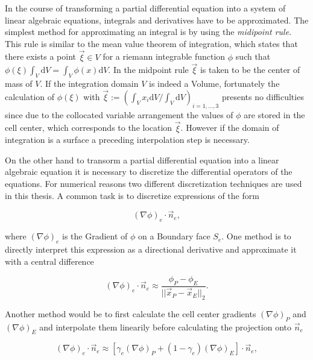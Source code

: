     In the course of transforming a partial differential equation into a system of linear algebraic equations, integrals and derivatives have to be approximated. The simplest method for approximating an integral is by using the \textit{midipoint rule}. This rule is similar to the mean value theorem of integration, which states that there exists a point \(\vec{\xi} \in V\) for a riemann integrable function \(\phi\) such that \(\phi(\xi) \int_V \mathrm{d}V = \int_V \phi(x) \mathrm{d}V\). In the midpoint rule \(\vec{\xi}\) is taken to be the center of mass of \(V\). If the integration domain \(V\) is indeed a Volume, fortunately the calculation of \(\phi(\mathbb{\xi})\) with \(\vec{\xi} := \left({ \int_V x_i \mathrm{d}V }/{ \int_V \mathrm{d}V } \right)_{i = 1,\dots,3}\) presents no difficulties since due to the collocated variable arrangement the values of \(\phi\) are stored in the cell center, which corresponds to the location \(\vec{\xi}\). However if the domain of integration is a surface a preceding interpolation step is necessary.

    On the other hand to transorm a partial differential equation into a linear algebraic equation it is necessary to discretize the differential operators of the equations. For numerical reasons two different discretization techniques are used in this thesis. A common task is to discretize expressions of the form

    \begin{displaymath}
      \left(\nabla \phi\right)_e \cdot \vec{n}_e,
    \end{displaymath}

    where \(\left(\nabla \phi\right)_e\) is the Gradient of \(\phi\) on a Boundary face \(S_e\). One method is to directly interpret this expression as a directional derivative and approximate it with a central difference

    \begin{displaymath}
      \left(\nabla \phi\right)_e \cdot \vec{n}_e \approx \frac{\phi_P - \phi_E}{|| \vec{x}_P - \vec{x}_E ||_2}.
    \end{displaymath}

    Another method would be to first calculate the cell center gradients \(\left(\nabla \phi \right)_P\) and \(\left(\nabla \phi \right)_E\) and interpolate them linearily before calculating the projection onto \(\vec{n}_e\)

    \begin{displaymath}
      \left(\nabla \phi\right)_e \cdot \vec{n}_e 
      \approx 
      \left[\gamma_e \left(\nabla \phi \right)_P + (1-\gamma_e) \left(\nabla \phi \right)_E \right] \cdot \vec{n}_e,
    \end{displaymath}

